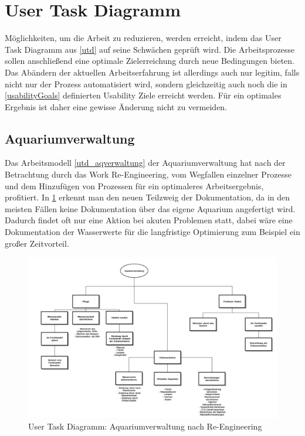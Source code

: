 \section{User Task Diagramm}
Möglichkeiten, um die Arbeit zu reduzieren, werden erreicht, indem das User Task Diagramm aus \ref{utd} auf seine Schwächen geprüft wird. Die Arbeitsprozesse sollen anschließend eine optimale Zielerreichung durch neue Bedingungen bieten. Das Abändern der aktuellen Arbeitserfahrung ist allerdings auch nur legitim, falls nicht nur der Prozess automatisiert wird, sondern gleichzeitig auch noch die in \ref{usabilityGoals} definierten Usability Ziele  erreicht werden. Für ein optimales Ergebnis ist daher eine gewisse Änderung nicht zu vermeiden.

\subsection{Aquariumverwaltung}
Das Arbeitsmodell \ref{utd_aqverwaltung} der Aquariumverwaltung hat nach der Betrachtung durch das Work Re-Engineering, vom Wegfallen einzelner Prozesse und dem Hinzufügen von Prozessen für ein optimaleres Arbeitsergebnis, profitiert. In \ref{utd_aqverwaltung_reengineering} erkennt man den neuen Teilzweig der Dokumentation, da in den meisten Fällen keine Dokumentation über das eigene Aquarium angefertigt wird. Dadurch findet oft nur eine Aktion bei akuten Problemen statt, dabei wäre eine Dokumentation der Wasserwerte für die langfristige Optimierung zum Beispiel ein großer Zeitvorteil.

\begin{figure}
	\centering
	\includegraphics[width=\linewidth,height=\textheight,
keepaspectratio]{utd_aqverwaltung_reenginered}
	\caption{User Task Diagramm: Aquariumverwaltung nach Re-Engineering}
	\label{utd_aqverwaltung_reengineering}
\end{figure}

